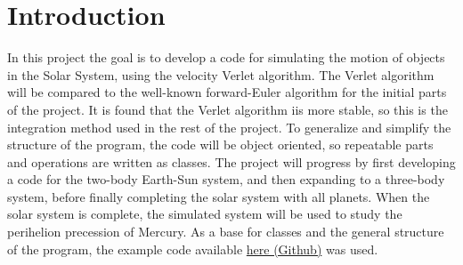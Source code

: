 \section{Introduction}
In this project the goal is to develop a code for simulating the motion of objects in the Solar System, using the velocity
Verlet algorithm. The Verlet algorithm will be compared to the well-known forward-Euler algorithm for the
initial parts of the project. It is found that the Verlet algorithm iis more stable, so this is the integration method used in the rest of the project.  
To generalize and simplify the structure of the program, 
the code will be object oriented, so repeatable parts and operations are written as classes.
The project will progress by first developing a code for the two-body Earth-Sun system, and then
expanding to a three-body system, before finally completing the solar system with all planets.
When the solar system is complete, the simulated system will be used to study the perihelion
precession of Mercury.
\newline
As a base for classes and the general structure of the program, the example code available
\href{https://github.com/andeplane/solar-system}{here (Github)} was used.
